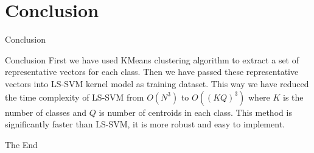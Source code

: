 \documentclass{beamer}
\begin{document}
    \section{Conclusion}
    \begin{frame}{Conclusion}
        \begin{block}{Conclusion}
            First we have used KMeans clustering algorithm to extract a set of representative vectors for each class.
            Then we have passed these representative vectors into LS-SVM kernel model as training dataset.
            This way we have reduced the time complexity of LS-SVM from $O(N^3)$ to $O((KQ)^3)$ where $K$ is the number of classes and $Q$ is number of centroids in each class.
            This method is significantly faster than LS-SVM, it is more robust and easy to implement.
        \end{block}
    \end{frame}

    \begin{frame}
        \Huge{\centerline{The End}}
    \end{frame}
\end{document}
